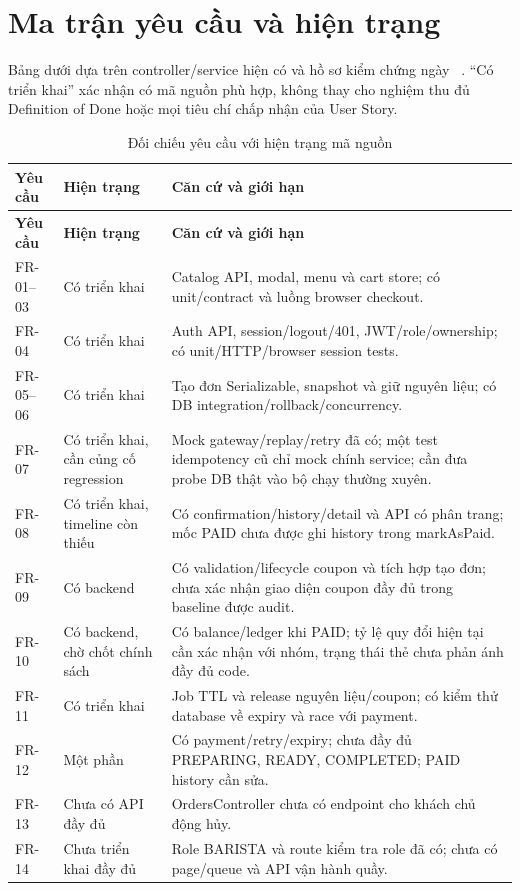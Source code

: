 \section{Ma trận yêu cầu và hiện trạng}
\label{sec:status}
Bảng dưới dựa trên controller/service hiện có và hồ sơ kiểm chứng ngày
\NgayDoiChieu~\cite{audit}. ``Có triển khai'' xác nhận có mã nguồn phù
hợp, không thay cho nghiệm thu đủ Definition of Done hoặc mọi tiêu chí
chấp nhận của User Story.
{\small{}
\begin{longtable}{@{}L{0.12\textwidth}L{0.25\textwidth}L{0.56\textwidth}@{}}
\caption{Đối chiếu yêu cầu với hiện trạng mã nguồn}\label{tab:implementation}\\
\toprule\textbf{Yêu cầu} & \textbf{Hiện trạng} & \textbf{Căn cứ và giới hạn} \\\midrule\endfirsthead
\toprule\textbf{Yêu cầu} & \textbf{Hiện trạng} & \textbf{Căn cứ và giới hạn} \\\midrule\endhead
\bottomrule\endfoot
FR-01--03 & Có triển khai & Catalog API, modal, menu và cart store; có unit/contract và luồng browser checkout. \\
FR-04 & Có triển khai & Auth API, session/logout/401, JWT/role/ownership; có unit/HTTP/browser session tests. \\
FR-05--06 & Có triển khai & Tạo đơn Serializable, snapshot và giữ nguyên liệu; có DB integration/rollback/concurrency. \\
FR-07 & Có triển khai, cần củng cố regression & Mock gateway/replay/retry đã có; một test idempotency cũ chỉ mock chính service; cần đưa probe DB thật vào bộ chạy thường xuyên. \\
FR-08 & Có triển khai, timeline còn thiếu & Có confirmation/history/detail và API có phân trang; mốc PAID chưa được ghi history trong markAsPaid. \\
FR-09 & Có backend & Có validation/lifecycle coupon và tích hợp tạo đơn; chưa xác nhận giao diện coupon đầy đủ trong baseline được audit. \\
FR-10 & Có backend, chờ chốt chính sách & Có balance/ledger khi PAID; tỷ lệ quy đổi hiện tại cần xác nhận với nhóm, trạng thái thẻ chưa phản ánh đầy đủ code. \\
FR-11 & Có triển khai & Job TTL và release nguyên liệu/coupon; có kiểm thử database về expiry và race với payment. \\
FR-12 & Một phần & Có payment/retry/expiry; chưa đầy đủ PREPARING, READY, COMPLETED; PAID history cần sửa. \\
FR-13 & Chưa có API đầy đủ & OrdersController chưa có endpoint cho khách chủ động hủy. \\
FR-14 & Chưa triển khai đầy đủ & Role BARISTA và route kiểm tra role đã có; chưa có page/queue và API vận hành quầy. \\
\end{longtable}}

